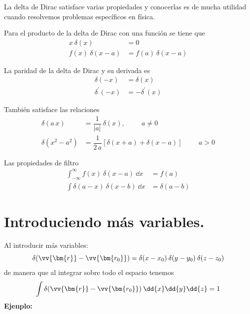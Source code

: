 La delta de Dirac satisface varias propiedades y conocerlas es de mucha utilidad cuando resolvemos problemas específicos en física. 
\par
\begin{propiedad}
Para el producto de la delta de Dirac con una función se tiene que
\begin{align}
x \: \delta(x) &= 0 \\
f(x) \: \delta(x - a) &= f(a) \: \delta(x - a)
\end{align}
\end{propiedad}
\begin{propiedad}
La paridad de la delta de Dirac y su derivada es
\begin{align}
\delta (-x) &= \delta (x) \\
\delta^{\prime} (-x) &= - \delta^{\prime} (x)
\end{align}
\end{propiedad}
\begin{propiedad}
También satisface las relaciones
\begin{align}
\delta(a \, x) &= \dfrac{1}{\vert a \vert} \: \delta (x), \hspace{1cm} a \neq 0 \\
\delta (x^{2} - a^{2}) &= \dfrac{1}{2 \, a} \left[ \delta (x + a) + \delta (x - a) \right] \hspace{1cm} a > 0
\end{align}
\end{propiedad}
\begin{propiedad}
Las propiedades de filtro
\begin{align}
\int_{-\infty}^{\infty} f(x) \: \delta (x - a) \: \dd{x} &= f(a) \\
\int \delta (a - x) \: \delta (x - b) \: \dd{x} &= \delta (a - b)
\end{align}
\end{propiedad}
\section{Introduciendo más variables.}
Al introducir más variables:
\begin{equation}
\delta (\vv{\bm{r}} - \vv{\bm{r_{0}}}) = \delta (x - x_{0}) \: \delta (y - y_{0}) \: \delta (z - z_{0})
\label{eq:ecuacion_A_03}
\end{equation}
de manera que al integrar sobre todo el espacio tenemos
\[ \int \delta (\vv{\bm{r}} - \vv{\bm{r_{0}}}) \: \dd{x} \dd{y}  \dd{z} = 1 \]
\textbf{Ejenplo:}

